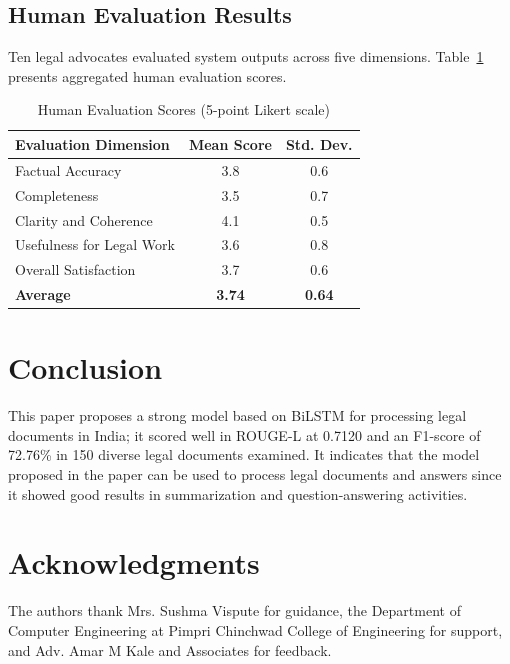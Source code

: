 \documentclass[preprint,12pt]{elsarticle}
\begin{document}
\subsection{Human Evaluation Results}

Ten legal advocates evaluated system outputs across five dimensions. Table~\ref{tab:human_eval} presents aggregated human evaluation scores.

\begin{table}[ht]
\centering
\caption{Human Evaluation Scores (5-point Likert scale)}
\label{tab:human_eval}
\begin{tabular}{lcc}
\toprule
\textbf{Evaluation Dimension} & \textbf{Mean Score} & \textbf{Std. Dev.} \\
\midrule
Factual Accuracy & 3.8 & 0.6 \\
Completeness & 3.5 & 0.7 \\
Clarity and Coherence & 4.1 & 0.5 \\
Usefulness for Legal Work & 3.6 & 0.8 \\
Overall Satisfaction & 3.7 & 0.6 \\
\midrule
\textbf{Average} & \textbf{3.74} & \textbf{0.64} \\
\bottomrule
\end{tabular}
\end{table}

\section{Conclusion }
This paper proposes a strong model based on BiLSTM for processing legal documents in India; it scored well in ROUGE-L at 0.7120 and an F1-score of 72.76\% in 150 diverse legal documents examined. It indicates that the model proposed in the paper can be used to process legal documents and answers since it showed good results in summarization and question-answering activities.

\section*{Acknowledgments}

The authors thank Mrs. Sushma Vispute for guidance, the Department of Computer Engineering at Pimpri Chinchwad College of Engineering for support, and Adv. Amar M Kale and Associates for feedback.
\end{document}
